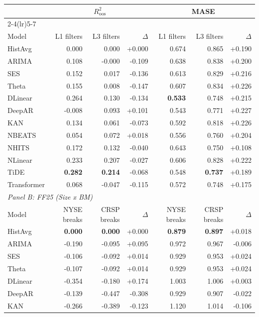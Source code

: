 \begin{tabular}{lrrrrrr}
\toprule
& \multicolumn{3}{c}{$R^2_{\text{oos}}$} & \multicolumn{3}{c}{MASE} \\
\cmidrule(lr){2-4}\cmidrule(lr){5-7}
\multicolumn{7}{l}{\textit{Panel A: Options (CJS 54)}} \\
\midrule
Model & L1 filters & L3 filters & $\Delta$ & L1 filters & L3 filters & $\Delta$ \\
\midrule
HistAvg & 0.000 & 0.000 & +0.000 & 0.674 & 0.865 & +0.190 \\
ARIMA & 0.108 & -0.000 & -0.109 & 0.638 & 0.838 & +0.200 \\
SES & 0.152 & 0.017 & -0.136 & 0.613 & 0.829 & +0.216 \\
Theta & 0.155 & 0.008 & -0.147 & 0.607 & 0.834 & +0.226 \\
DLinear & 0.264 & 0.130 & -0.134 & \textbf{0.533} & 0.748 & +0.215 \\
DeepAR & -0.008 & 0.093 & +0.101 & 0.543 & 0.771 & +0.227 \\
KAN & 0.134 & 0.061 & -0.073 & 0.592 & 0.818 & +0.226 \\
NBEATS & 0.054 & 0.072 & +0.018 & 0.556 & 0.760 & +0.204 \\
NHITS & 0.172 & 0.132 & -0.040 & 0.643 & 0.750 & +0.108 \\
NLinear & 0.233 & 0.207 & -0.027 & 0.606 & 0.828 & +0.222 \\
TiDE & \textbf{0.282} & \textbf{0.214} & -0.068 & 0.548 & \textbf{0.737} & +0.189 \\
Transformer & 0.068 & -0.047 & -0.115 & 0.572 & 0.748 & +0.175 \\
\midrule
\multicolumn{7}{l}{\textit{Panel B: FF25 (Size x BM)}} \\
\midrule
Model & NYSE breaks & CRSP breaks & $\Delta$ & NYSE breaks & CRSP breaks & $\Delta$ \\
\midrule
HistAvg & \textbf{0.000} & \textbf{0.000} & +0.000 & \textbf{0.879} & \textbf{0.897} & +0.018 \\
ARIMA & -0.190 & -0.095 & +0.095 & 0.972 & 0.967 & -0.006 \\
SES & -0.106 & -0.092 & +0.014 & 0.929 & 0.953 & +0.024 \\
Theta & -0.107 & -0.092 & +0.014 & 0.929 & 0.953 & +0.024 \\
DLinear & -0.354 & -0.180 & +0.174 & 1.003 & 1.006 & +0.003 \\
DeepAR & -0.139 & -0.447 & -0.308 & 0.929 & 0.907 & -0.022 \\
KAN & -0.266 & -0.389 & -0.123 & 1.120 & 1.014 & -0.106 \\

\end{tabular}
